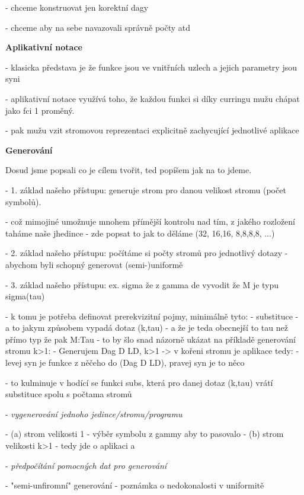 \documentclass[a4paper,oneside]{memoir}
\begin{document}
- chceme konstruovat jen korektní dagy

- chceme aby na sebe navazovali správně počty atd

\textbf{Aplikativní notace}

- klasicka představa je že funkce jsou ve vnitřních uzlech a jejich parametry jsou syni

- aplikativní notace využívá toho, že každou funkci si díky curringu mužu chápat jako fci 1 proměný. 

- pak mužu vzit stromovou reprezentaci explicitně zachycující jednotlivé aplikace

\textbf{Generování}

Dosud jsme popsali co je cílem tvořit, ted popíšem jak na to jdeme.

- 1. základ našeho přístupu: generuje strom pro danou velikost stromu (počet symbolů).
  
  - což mimojiné umožnuje mnohem přímější kontrolu nad tím, z jakého rozložení taháme naše jhedince 
  - zde popsat to jak to děláme (32, 16,16, 8,8,8,8, ...)

- 2. základ našeho přístupu: počítáme si počty stromů pro jednotlivý dotazy 
     - abychom byli schopný generovat (semi-)uniformě

- 3. základ našeho přístupu: ex. sigma že z gamma de vyvodit že M je typu sigma(tau)

  - k tomu je potřeba definovat prerekvizitní pojmy, minimálně tyto:
    - substituce
    - a to jakym způsobem vypadá dotaz (k,tau) - a že je teda obecnejší to tau než přímo typ že pak M:Tau
      - to by šlo snad názorně ukázat na příkladě generování stromu k>1:
      - Generujem Dag D LD, k>1 -> v kořeni stromu je aplikace tedy:
         - levej syn je funkce z něčeho do (Dag D LD), pravej syn je to něco

  - to kulminuje v hodící se funkci subs, která pro danej dotaz (k,tau) vrátí substituce spolu s počtama stromů


- \textit{vygenerování jednoho jedince/stromu/programu}

 - (a) strom velikosti 1 - výběr symbolu z gammy aby to pasovalo
 - (b) strom velikosti k>1 - tedy jde o aplikaci a

- \textit{předpočítání pomocných dat pro generování}


- "semi-unfiromní" generování - poznámka o nedokonalosti v uniformitě

~\\

~\\
\end{document}
